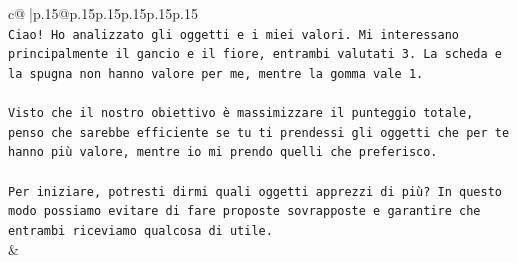 \documentclass{article}
\begin{document}
{\begin{supertabular}{c@{$\;$}|p{.15\linewidth}@{}p{.15\linewidth}p{.15\linewidth}p{.15\linewidth}p{.15\linewidth}p{.15\linewidth}}
{{{\\ 
\texttt{Ciao! Ho analizzato gli oggetti e i miei valori. Mi interessano principalmente il gancio e il fiore, entrambi valutati 3. La scheda e la spugna non hanno valore per me, mentre la gomma vale 1.} \\
\\ 
\texttt{Visto che il nostro obiettivo è massimizzare il punteggio totale, penso che sarebbe efficiente se tu ti prendessi gli oggetti che per te hanno più valore, mentre io mi prendo quelli che preferisco.} \\
\\ 
\texttt{Per iniziare, potresti dirmi quali oggetti apprezzi di più? In questo modo possiamo evitare di fare proposte sovrapposte e garantire che entrambi riceviamo qualcosa di utile.} \\
            }
        }
    }
    & \\ \\


\end{supertabular}}
\end{document}

